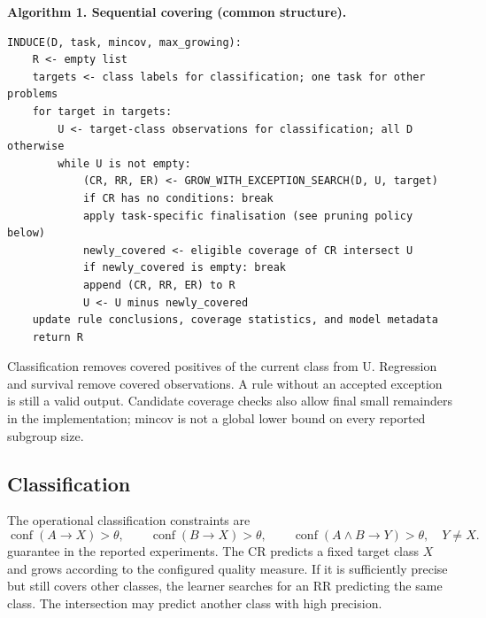\noindent\begin{minipage}{\linewidth}
\textbf{Algorithm 1. Sequential covering (common structure).}


\begin{Verbatim}[fontsize=\scriptsize,frame=single,samepage=true]
INDUCE(D, task, mincov, max_growing):
    R <- empty list
    targets <- class labels for classification; one task for other problems
    for target in targets:
        U <- target-class observations for classification; all D otherwise
        while U is not empty:
            (CR, RR, ER) <- GROW_WITH_EXCEPTION_SEARCH(D, U, target)
            if CR has no conditions: break
            apply task-specific finalisation (see pruning policy below)
            newly_covered <- eligible coverage of CR intersect U
            if newly_covered is empty: break
            append (CR, RR, ER) to R
            U <- U minus newly_covered
    update rule conclusions, coverage statistics, and model metadata
    return R
\end{Verbatim}
\end{minipage}
Classification removes covered positives of the current class from {\ttfamily\small U}.
Regression and survival remove covered observations. A rule without an accepted
exception is still a valid output. Candidate coverage checks also allow final
small remainders in the implementation; {\ttfamily\small mincov} is not a global lower bound
on every reported subgroup size.



\subsection{Classification}
\label{classification-ceris}
The operational classification constraints are
\[
\operatorname{conf}(A\to X)>\theta,\qquad
\operatorname{conf}(B\to X)>\theta,\qquad
\operatorname{conf}(A\land B\to Y)>\theta,\quad Y\ne X.
\]
guarantee in the reported experiments.
The CR predicts a fixed target class \(X\) and grows according to the
configured quality measure. If it is sufficiently precise but still covers
other classes, the learner searches for an RR predicting the same class.
The intersection may predict another class with high precision.

